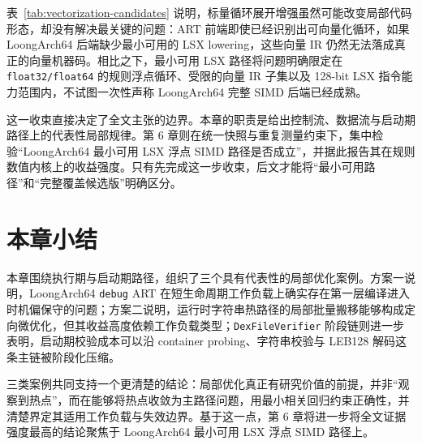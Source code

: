 表~\ref{tab:vectorization-candidates} 说明，标量循环展开增强虽然可能改变局部代码形态，却没有解决最关键的问题：ART 前端即使已经识别出可向量化循环，如果 LoongArch64 后端缺少最小可用的 LSX lowering，这些向量 IR 仍然无法落成真正的向量机器码。相比之下，最小可用 LSX 路径将问题明确限定在 \texttt{float32/float64} 的规则浮点循环、受限的向量 IR 子集以及 128-bit LSX 指令能力范围内，不试图一次性声称 LoongArch64 完整 SIMD 后端已经成熟。

这一收束直接决定了全文主张的边界。本章的职责是给出控制流、数据流与启动期路径上的代表性局部规律。第 6 章则在统一快照与重复测量约束下，集中检验“LoongArch64 最小可用 LSX 浮点 SIMD 路径是否成立”，并据此报告其在规则数值内核上的收益强度。只有先完成这一步收束，后文才能将“最小可用路径”和“完整覆盖候选版”明确区分。

\section{本章小结}

本章围绕执行期与启动期路径，组织了三个具有代表性的局部优化案例。方案一说明，LoongArch64 \texttt{debug} ART 在短生命周期工作负载上确实存在第一层编译进入时机偏保守的问题；方案二说明，运行时字符串热路径的局部批量搬移能够构成定向微优化，但其收益高度依赖工作负载类型；\texttt{DexFileVerifier} 阶段链则进一步表明，启动期校验成本可以沿 container probing、字符串校验与 LEB128 解码这条主链被阶段化压缩。

三类案例共同支持一个更清楚的结论：局部优化真正有研究价值的前提，并非“观察到热点”，而在能够将热点收敛为主路径问题，用最小相关回归约束正确性，并清楚界定其适用工作负载与失效边界。基于这一点，第 6 章将进一步将全文证据强度最高的结论聚焦于 LoongArch64 最小可用 LSX 浮点 SIMD 路径上。